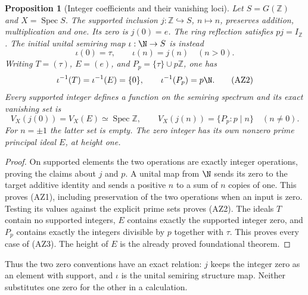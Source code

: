 \documentclass[11pt,a4paper]{article}
\newtheorem{proposition}[theorem]{Proposition}
\theoremstyle{definition}\newtheorem{definition}[theorem]{Definition}
\newcommand{\Z}{\mathbb Z}\newcommand{\Q}{\mathbb Q}
\newcommand{\Spec}{\operatorname{Spec}}\newcommand{\SpecMon}{\operatorname{Spec}_{\mathrm{mon}}}
\begin{document}
\begin{proposition}[Integer coefficients and their vanishing loci]
Let $S=G(\Z)$ and $X=\Spec S$. The supported inclusion
$j:\Z\hookrightarrow S$, $n\mapsto n$, preserves addition, multiplication
and one. Its zero is $j(0)=e$. The ring reflection satisfies $pj=I_\Z$.
The initial unital semiring map $\iota:\N\to S$ is instead
\[
 \iota(0)=\tau,\qquad \iota(n)=j(n)\quad(n>0).
 \tag{AZ1}
\]
Writing $T=(\tau)$, $E=(e)$, and $P_p=\{\tau\}\cup p\Z$, one has
\[
 \iota^{-1}(T)=\iota^{-1}(E)=\{0\},\qquad
 \iota^{-1}(P_p)=p\N.
 \tag{AZ2}
\]
Every supported integer defines a function on the semiring spectrum and
its exact vanishing set is
\[
 V_X(j(0))=V_X(E)\simeq\Spec\Z,\qquad
 V_X(j(n))=\{P_p:p\mid n\}\quad(n\ne0).
 \tag{AZ3}
\]
For $n=\pm1$ the latter set is empty. The zero integer has its own
nonzero prime principal ideal $E$, at height one.
\end{proposition}
\begin{proof}
On supported elements the two operations are exactly integer operations,
proving the claims about $j$ and $p$. A unital map from $\N$ sends its zero
to the target additive identity and sends a positive $n$ to a sum of $n$
copies of one. This proves (AZ1), including preservation of the two
operations when an input is zero. Testing its values against the explicit
prime sets proves (AZ2). The ideals $T$ contain no supported integers,
$E$ contains exactly the supported integer zero, and $P_p$ contains exactly
the integers divisible by $p$ together with $\tau$. This proves every case
of (AZ3). The height of $E$ is the already proved foundational theorem.
\end{proof}

Thus the two zero conventions have an exact relation: $j$ keeps the
integer zero as an element with support, and $\iota$ is the unital semiring
structure map. Neither substitutes one zero for the other in a calculation.
\end{document}
